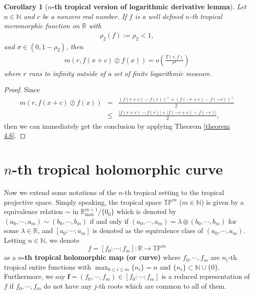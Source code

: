 \documentclass{article}
\newtheorem{corollary}[defin]{Corollary}
\begin{document}
\begin{corollary}[\textbf{$n$-th tropical version of logarithmic derivative lemma}]\label{cor4.7}
     Let $n\in\mathbb{N}$ and $c$ be a nonzero real number. If $f$ is a well defined $n$-th tropical meromorphic function on $\mathbb{R}$ with
    \begin{eqnarray*}
        \rho_{2}(f):=\rho_{2}<1,
    \end{eqnarray*}
    and $\sigma\in(0, 1-\rho_{2})$, then 
    \begin{eqnarray*}
        m(r, f(x+c)\oslash f(x))=o\left(\frac{T(r, f)}{r^{\sigma}}\right)
    \end{eqnarray*}
    where $r$ runs to infinity outside of a set of finite logarithmic measure.
\end{corollary}
\begin{proof}
    Since
    \begin{eqnarray*}
        m\left(r, f(x+c)\oslash f(x)\right)&=&\frac{(f(r+c)-f(r))^{+}+(f(-r+c)-f(-r))^{+}}{2}\\
        &\leq& \frac{|f(r+c)-f(r)|+|f(-r+c)-f(-r)|}{2},
    \end{eqnarray*}
    then we can immediately get the conclusion by applying Theorem \ref{theorem 4.6}.
\end{proof}

\section{$n$-th tropical holomorphic curve}
Now we extend some notations of the $n$-th tropical setting to the tropical projective space. Simply speaking, the tropical space $\mathbb{T}\mathbb{P}^{m}$ ($m\in\mathbb{N}$) is given by a equivalence relation $\sim$ in $\mathbb{R}_{\max}^{m+1}\slash \{0_{0}\}$ which is denoted by $(a_{0}, \cdots, a_{m})\sim(b_{0}, \cdots, b_{m})$ if and only if $(a_{0}, \cdots, a_{m})=\lambda\otimes(b_{0}, \cdots, b_{m})$ for some $\lambda\in\mathbb{R}$, and $[a_{0}: \cdots: a_{m}]$ is denoted as the equivalence class of $(a_{0}, \cdots, a_{m})$. Letting $n\in\mathbb{N}$, we denote
\begin{equation*}
        f=[f_{0}: \cdots: f_{m}]:\mathbb{R}\rightarrow \mathbb{T}\mathbb{P}^{m}
    \end{equation*}
    as a \textbf{$n$-th tropical holomorphic map (or curve)} where $f_{0}, \cdots, f_{m}$ are $n_{i}$-th tropical entire functions with $\max_{0\leq i\leq m}\{n_{i}\}=n$ and $\{n_{i}\}\subset \mathbb{N}\cup\{0\}$. Furthermore, we say $\textbf{f}=(f_{0}, \cdots, f_{m})\in [f_{0}: \cdots :f_{m}]$ is a reduced representation of $f$ if $f_{0}, \cdots, f_{m}$ do not have any $j$-th roots which are common to all of them.
\end{document}
